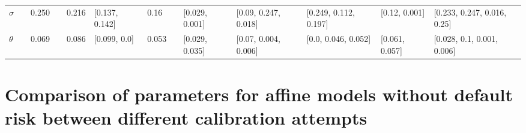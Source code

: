 \begin{table}[H]
\begin{adjustbox}{width=\textwidth}
\begin{tabular}{lrrlrllllllll}
			$\sigma$ &        &  0.250 &                 &  0.216 &  [0.137, 0.142] &             0.16 &                        &  [0.029, 0.001] &   [0.09, 0.247, 0.018] &  [0.249, 0.112, 0.197] &    [0.12, 0.001] &   [0.233, 0.247, 0.016, 0.25] \\
			$\theta$ &        &  0.069 &                 &  0.086 &    [0.099, 0.0] &            0.053 &                        &  [0.029, 0.035] &   [0.07, 0.004, 0.006] &    [0.0, 0.046, 0.052] &   [0.061, 0.057] &    [0.028, 0.1, 0.001, 0.006] \\
			\bottomrule
		\end{tabular}
		
	\end{adjustbox}
	
\end{table}

\section{Comparison of parameters for affine models without default risk between different calibration attempts}

\label{defaultless_parameter_comparision}

